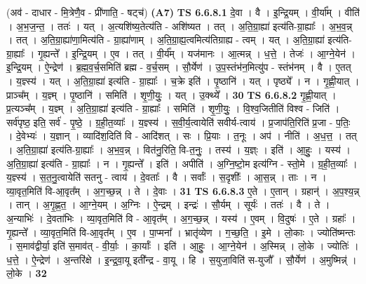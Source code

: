 \documentclass[17pt]{extarticle}
\begin{document}
                  \newline
                      (अव॑ - दाधार - मि॒त्रेणै॒व - प्री॑णाति॒ - षट्च॑)  \textbf{(A7)} \newline \newline
                                \textbf{ TS 6.6.8.1} \newline
                  दे॒वा । वै । इ॒न्द्रि॒यम् । वी॒र्या᳚म् । वीति॑ । अ॒भ॒ज॒न्त॒ । ततः॑ । यत् । अ॒त्यशि॑ष्य॒तेत्य॑ति - अशि॑ष्यत । तत् । अ॒ति॒ग्रा॒ह्या॑ इत्य॑ति-ग्रा॒ह्याः᳚ । अ॒भ॒व॒न्न् । तत् । अ॒ति॒ग्रा॒ह्या॑णा॒मित्य॑ति - ग्रा॒ह्या॑णाम् । अ॒ति॒ग्रा॒ह्य॒त्वमित्य॑तिग्राह्य - त्वम् । यत् । अ॒ति॒ग्रा॒ह्या॑ इत्य॑ति-ग्रा॒ह्याः᳚ । गृ॒ह्यन्ते᳚ । इ॒न्द्रि॒यम् । ए॒व । तत् । वी॒र्य᳚म् । यज॑मानः । आ॒त्मन्न् । ध॒त्ते॒ । तेजः॑ । आ॒ग्ने॒येन॑ । इ॒न्द्रि॒यम् । ऐ॒न्द्रेण॑ । ब्र॒ह्म॒व॒र्च॒समिति॑ ब्रह्म - व॒र्च॒सम् । सौ॒र्येण॑ । उ॒प॒स्तंभ॑न॒मित्यु॑प - स्तंभ॑नम् । वै । ए॒तत् । य॒ज्ञ्स्य॑ । यत् । अ॒ति॒ग्रा॒ह्या॑ इत्य॑ति - ग्रा॒ह्याः᳚ । च॒क्रे इति॑ । पृ॒ष्ठानि॑ । यत् । पृष्ठ्ये᳚ । न । गृ॒ह्णी॒यात् । प्राञ्च᳚म् । य॒ज्ञ्म् । पृ॒ष्ठानि॑ । समिति॑ । शृ॒णी॒युः॒ । यत् । उ॒क्थ्ये᳚ । \textbf{  30} \newline
                  \newline
                                \textbf{ TS 6.6.8.2} \newline
                  गृ॒ह्णी॒यात् । प्र॒त्यञ्च᳚म् । य॒ज्ञ्म् । अ॒ति॒ग्रा॒ह्या॑ इत्य॑ति - ग्रा॒ह्याः᳚ । समिति॑ । शृ॒णी॒युः॒ । वि॒श्व॒जितीति॑ विश्व - जिति॑ । सर्व॑पृष्ठ॒ इति॒ सर्व॑ - पृ॒ष्ठे॒ । ग्र॒ही॒त॒व्याः᳚ । य॒ज्ञ्स्य॑ । स॒वी॒र्य॒त्वायेति॑ सवीर्य-त्वाय॑ । प्र॒जाप॑ति॒रिति॑ प्र॒जा - प॒तिः॒ । दे॒वेभ्यः॑ । य॒ज्ञान् । व्यादि॑श॒दिति॑ वि - आदि॑शत् । सः । प्रि॒याः । त॒नूः । अप॑ । नीति॑ । अ॒ध॒त्त॒ । तत् । अ॒ति॒ग्रा॒ह्या॑ इत्य॑ति-ग्रा॒ह्याः᳚ । अ॒भ॒व॒न्न् । वित॑नु॒रिति॒ वि-त॒नुः॒ । तस्य॑ । य॒ज्ञ्ः । इति॑ । आ॒हुः॒ । यस्य॑ । अ॒ति॒ग्रा॒ह्या॑ इत्य॑ति - ग्रा॒ह्याः᳚ । न । गृ॒ह्यन्ते᳚ । इति॑ । अपीति॑ । अ॒ग्नि॒ष्टो॒म इत्य॑ग्नि - स्तो॒मे । ग्र॒ही॒त॒व्याः᳚ । य॒ज्ञ्स्य॑ । स॒त॒नु॒त्वायेति॑ सतनु - त्वाय॑ । दे॒वताः᳚ । वै । सर्वाः᳚ । स॒दृशीः᳚ । आ॒स॒न्न् । ताः । न । व्या॒वृत॒मिति॑ वि-आ॒वृत᳚म् । अ॒ग॒च्छ॒न्न् । ते । दे॒वाः । \textbf{  31} \newline
                  \newline
                                \textbf{ TS 6.6.8.3} \newline
                  ए॒ते । ए॒तान् । ग्रहान्॑ । अ॒प॒श्य॒न्न् । तान् । अ॒गृ॒ह्ण॒त॒ । आ॒ग्ने॒यम् । अ॒ग्निः । ऐ॒न्द्रम् । इन्द्रः॑ । सौ॒र्यम् । सूर्यः॑ । ततः॑ । वै । ते । अ॒न्याभिः॑ । दे॒वता॑भिः । व्या॒वृत॒मिति॑ वि - आ॒वृत᳚म् । अ॒ग॒च्छ॒न्न् । यस्य॑ । ए॒वम् । वि॒दुषः॑ । ए॒ते । ग्रहाः᳚ । गृ॒ह्यन्ते᳚ । व्या॒वृत॒मिति॑ वि-आ॒वृत᳚म् । ए॒व । पा॒प्मना᳚ । भ्रातृ॑व्येण । ग॒च्छ॒ति॒ । इ॒मे । लो॒काः । ज्योति॑ष्मन्तः । स॒माव॑द्वीर्या॒ इति॑ स॒माव॑त् - वी॒र्याः॒ । का॒र्याः᳚ । इति॑ । आ॒हुः॒ । आ॒ग्ने॒येन॑ । अ॒स्मिन्न् । लो॒के । ज्योतिः॑ । ध॒त्ते॒ । ऐ॒न्द्रेण॑ । अ॒न्तरि॑क्षे । इ॒न्द्र॒वा॒यू इती᳚न्द्र - वा॒यू । हि । स॒युजा॒विति॑ स-युजौ᳚ । सौ॒र्येण॑ । अ॒मुष्मिन्न्॑ । लो॒के । \textbf{  32} \newline
\end{document}
